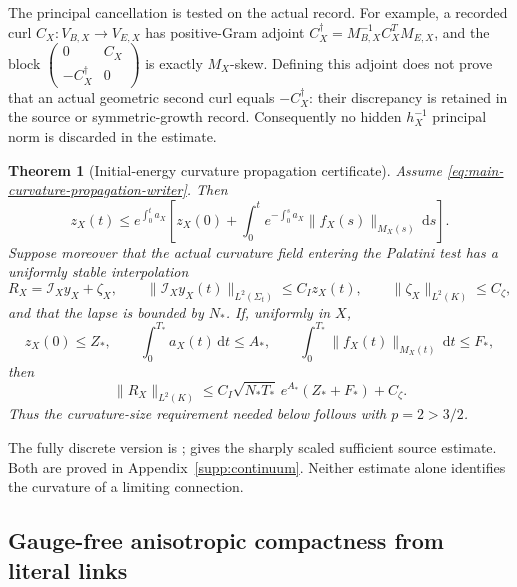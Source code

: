 \documentclass[11pt]{article}
\newtheorem{theorem}{Theorem}[section]
\numberwithin{equation}{section}
\theoremstyle{definition}
\theoremstyle{remark}
\newcommand{\dd}{\mathrm d}
\begin{document}
The principal cancellation is tested on the actual record.  For example, a
recorded curl $C_X:V_{B,X}\to V_{E,X}$ has positive-Gram adjoint
$C_X^\dagger=M_{B,X}^{-1}C_X^TM_{E,X}$, and the block
$\left(\begin{smallmatrix}0&C_X\\-C_X^\dagger&0\end{smallmatrix}\right)$
is exactly $M_X$-skew.  Defining this adjoint does not prove that an actual
geometric second curl equals $-C_X^\dagger$: their discrepancy is retained
in the source or symmetric-growth record.  Consequently no hidden
$h_X^{-1}$ principal norm is discarded in the estimate.

\begin{theorem}[Initial-energy curvature propagation certificate]
\label{thm:main-curvature-propagation}
Assume \eqref{eq:main-curvature-propagation-writer}.  Then
\begin{equation}
 z_X(t)\le e^{\int_0^t a_X}
 \left[z_X(0)+\int_0^t e^{-\int_0^s a_X}
 \|f_X(s)\|_{M_X(s)}\,\dd s\right].
 \label{eq:main-curvature-energy-propagation}
\end{equation}
Suppose moreover that the actual curvature field entering the Palatini test has
a uniformly stable interpolation
\begin{equation}
 R_X=\mathcal I_Xy_X+\zeta_X,
 \qquad
 \|\mathcal I_Xy_X(t)\|_{L^2(\Sigma_t)}\le C_Iz_X(t),
 \qquad
 \|\zeta_X\|_{L^2(K)}\le C_\zeta,
 \label{eq:main-curvature-incidence}
\end{equation}
and that the lapse is bounded by $N_*$.  If, uniformly in $X$,
\begin{equation}
 z_X(0)\le Z_*,\qquad
 \int_0^{T_*}a_X(t)\,\dd t\le A_*,\qquad
 \int_0^{T_*}\|f_X(t)\|_{M_X(t)}\,\dd t\le F_*,
 \label{eq:main-curvature-budgets}
\end{equation}
then
\begin{equation}
 \|R_X\|_{L^2(K)}
 \le C_I\sqrt{N_*T_*}\,e^{A_*}(Z_*+F_*)+C_\zeta.
 \label{eq:main-derived-l2-curvature}
\end{equation}
Thus the curvature-size requirement needed below follows with $p=2>3/2$.
\end{theorem}


The fully discrete version is ;
 gives the sharply scaled sufficient
source estimate. Both are proved in Appendix~\ref{supp:continuum}.
Neither estimate alone identifies the curvature of a limiting connection.
\subsection{Gauge-free anisotropic compactness from literal links}
\end{document}
